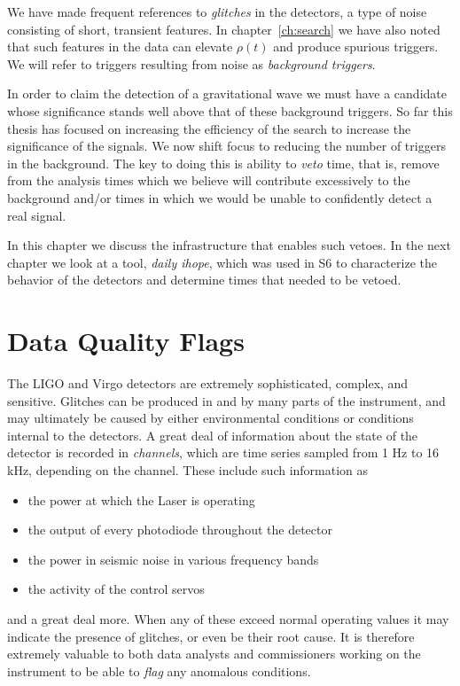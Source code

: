 We have made frequent references to \emph{glitches} in the detectors,
a type of noise consisting of short, transient features.  In
chapter~\ref{ch:search} we have also noted that such features in the
data can elevate $\rho(t)$ and produce spurious triggers.  We will
refer to triggers resulting from noise as \emph{background triggers}.

In order to claim the detection of a gravitational wave we must have a
candidate whose significance stands well above that of these
background triggers.  So far this thesis has focused on increasing the
efficiency of the search to increase the significance of the signals.
We now shift focus to reducing the number of triggers in the
background.  The key to doing this is ability to \emph{veto} time,
that is, remove from the analysis times which we believe will
contribute excessively to the background and/or times in which we
would be unable to confidently detect a real signal.

In this chapter we discuss the infrastructure that enables such
vetoes.  In the next chapter we look at a tool, \emph{daily ihope},
which was used in S6 to characterize the behavior of the detectors and
determine times that needed to be vetoed.


\section{Data Quality Flags}

The LIGO and Virgo detectors are extremely sophisticated, complex, and
sensitive.  Glitches can be produced in and by many parts of the
instrument, and may ultimately be caused by either environmental
conditions or conditions internal to the detectors.  A great deal of
information about the state of the detector is recorded in
\emph{channels}, which are time series sampled from 1 Hz to 16 kHz,
depending on the channel.  These include such information as
\begin{itemize}
\item the power at which the Laser is operating
\item the output of every photodiode throughout the detector
\item the power in seismic noise in various frequency bands
\item the activity of the control servos
\end{itemize}
%
and a great deal more.  When any of these exceed normal operating
values it may indicate the presence of glitches, or even be their root
cause.  It is therefore extremely valuable to both data analysts and 
commissioners working on the instrument to be able to \emph{flag} any
anomalous conditions.

